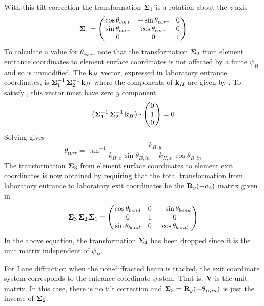 With this tilt correction the transformation ${\bf \Sigma}_1$ is a
rotation about the $z$ axis
\begin{equation}
  {\bf \Sigma}_1 = 
  \begin{pmatrix}
    \cos\theta_{corr} & -\sin\theta_{corr} & 0 \\
    \sin\theta_{corr} &  \cos\theta_{corr} & 0 \\
    0                 &  0                 & 1                
  \end{pmatrix}
\end{equation}
To calculate a value for $\theta_{corr}$, note that
the transformation ${\bf \Sigma}_2$ from element entrance coordinates to element surface
coordinates is not affected by a finite $\psi_H$ and so 
is unmodified. The ${\bf k}_H$ vector, expressed in laboratory entrance
coordinates, is ${\bf \Sigma}_1^{-1} \, {\bf \Sigma}_2^{-1} \, {\bf k}_H$ where the
components of ${\bf k}_H$ are given by . To
satisfy , this vector must have zero $y$ component
\begin{equation}
  \left( {\bf \Sigma}_1^{-1} \, {\bf \Sigma}_2^{-1} \, {\bf k}_H \right) \mathbin{\boldsymbol{\cdot}}
  \begin{pmatrix} 0 \\ 1 \\ 0 \end{pmatrix}
  = 0
\end{equation}
Solving gives
\begin{equation}
  \theta_{corr} = \tan^{-1} 
  \frac{k_{H,y}}{k_{H,z} \, \sin\theta_{B,in} - k_{H,x} \, \cos\theta_{B,in}}
\end{equation}
The transformation ${\bf \Sigma}_3$ from element surface coordinates to
element exit coordinates is now obtained by requiring that the total
transformation from laboratory entrance to laboratory exit coordinates
be the ${\bf R}_{y}(-\alpha_b)$ matrix given in 
\begin{equation}
  {\bf \Sigma}_3 \, {\bf \Sigma}_2 \, {\bf \Sigma}_1 = 
  \begin{pmatrix}
    \cos\theta_{bend} & 0 & -\sin\theta_{bend} \\
    0          & 1 & 0           \\
    \sin\theta_{bend} & 0 & \cos\theta_{bend}
  \end{pmatrix}
\end{equation}
In the above equation, the transformation ${\bf \Sigma}_4$ has been
dropped since it is the unit matrix independent of $\psi_H$.

For Laue diffraction when the non-diffracted beam is tracked, the exit
coordinate system corresponds to the entrance coordinate system. That
is, ${\bf V}$ is the unit matrix. In this case, there is no tilt
correction and ${\bf \Sigma}_3 = {\bf R}_y(-\theta_{B,in})$ is just the
inverse of ${\bf \Sigma}_2$.

